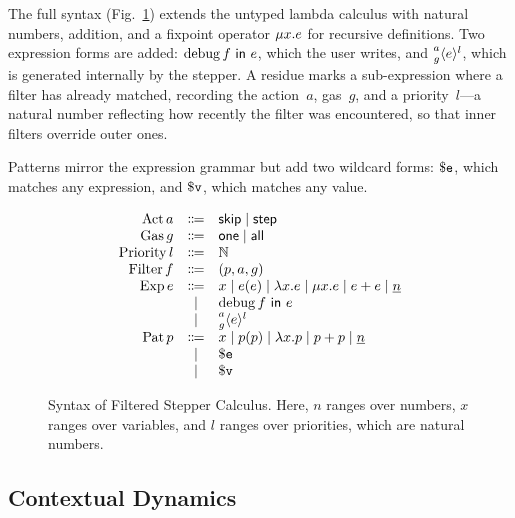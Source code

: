 The full syntax (Fig.~\ref{fig:filter-syntax}) extends the untyped
lambda calculus with natural numbers, addition, and a fixpoint operator
\(\Fix{x}{e}\) for recursive definitions. Two expression forms are
added: \(\Filter{f}{e}\), which the user writes, and
\(\Residue{a}{g}{l}{e}\), which is generated internally by the
stepper. A residue marks a sub-expression where a filter has already
matched, recording the action~\(a\), gas~\(g\), and a
priority~\(l\)---a natural number reflecting how recently the
filter was encountered, so that inner filters override outer ones.

Patterns mirror the expression grammar but add two wildcard forms:
\(\PatExpr\), which matches any expression, and \(\PatValue\), which
matches any value.

\begin{figure}[h]
  \begin{equation*}
    \begin{array}{rcl}
      \DefAct a    &\Coloneqq& \ActSkip \mid \ActStep \\
      \DefGas g    &\Coloneqq& \GasOne \mid \GasAll \\
      \DefLvl l    &\Coloneqq& \mathbb{N} \\
      \DefFilter f &\Coloneqq& (p, a, g) \\
      \DefExp e    &\Coloneqq& x \mid e(e) \mid \Lam{x}{e} \mid \Fix{x}{e} \mid e + e \mid \Nat{n} \\
                   &\mid     & \Filter{f}{e} \\
                   &\mid     & \Residue{a}{g}{l}{e} \\
      \DefPat p    &\Coloneqq& x \mid p(p) \mid \Lam{x}{p} \mid p + p \mid \Nat{n} \\
                   &\mid     & \PatExpr \\
                   &\mid     & \PatValue \\
    \end{array}
  \end{equation*}
  \caption{Syntax of Filtered Stepper Calculus. Here, $n$ ranges over numbers, $x$ ranges over variables, and $l$ ranges over priorities, which are natural numbers.}
  \label{fig:filter-syntax}
\end{figure}

\subsection{Contextual Dynamics}

